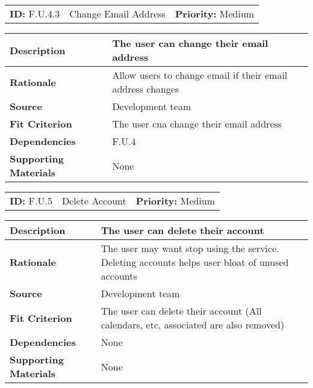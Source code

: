 \begin{table}[H]
    \begin{tabularx}{\textwidth}{| l | X | l |}
        \hline
        \textbf{ID:} F.U.4.3 & Change Email Address & \textbf{Priority:} Medium \\
    \end{tabularx}
    \begin{tabularx}{\textwidth}{| l | X |}
        \hline
        \textbf{Description} & The user can change their email address \\ \hline
        \textbf{Rationale} & Allow users to change email if their email address changes \\ \hline
        \textbf{Source} & Development team\\ \hline
        \textbf{Fit Criterion} & The user cna change their email address \\ \hline
        \textbf{Dependencies} & F.U.4 \\ \hline
        \textbf{Supporting Materials} & None \\ \hline
    \end{tabularx}
\end{table}

\begin{table}[H]
    \begin{tabularx}{\textwidth}{| l | X | l |}
        \hline
        \textbf{ID:} F.U.5 & Delete Account & \textbf{Priority:} Medium \\
    \end{tabularx}
    \begin{tabularx}{\textwidth}{| l | X |}
        \hline
        \textbf{Description} & The user can delete their account\\ \hline
        \textbf{Rationale} & The user may want stop using the service. Deleting accounts helps user bloat of unused accounts\\ \hline
        \textbf{Source} &  Development team\\ \hline
        \textbf{Fit Criterion} & The user can delete their account (All calendars, etc, associated are also removed) \\ \hline
        \textbf{Dependencies} & None \\ \hline
        \textbf{Supporting Materials} & None \\ \hline
    \end{tabularx}
\end{table}

\FloatBarrier

